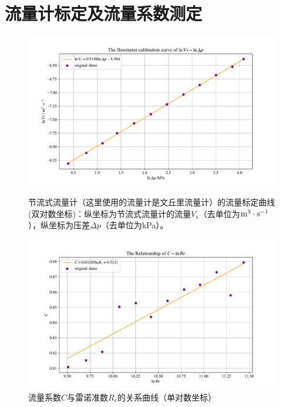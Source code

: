 \documentclass[UTF8,AutoFakeBold,a4paper]{article}
\begin{document}
\newpage
	\section{流量计标定及流量系数测定}
\begin{figure}[h]
	\centering
	\includegraphics[scale=0.5]{文丘里1}
	\caption{节流式流量计（这里使用的流量计是文丘里流量计）的流量标定曲线(双对数坐标)：纵坐标为节流式流量计的流量$V_{s}$（去单位为$\rm{m}^{3}\cdot\rm{s}^{-1}$），纵坐标为压差$\Delta p$（去单位为kPa）。}
	\label{fi1}
	
	\centering
	\includegraphics[scale=0.5]{文丘里2.pdf}
	\caption{流量系数$C$与雷诺准数$R_{e}$的关系曲线（单对数坐标）}
	\label{fi2}
\end{figure}
\end{document}
